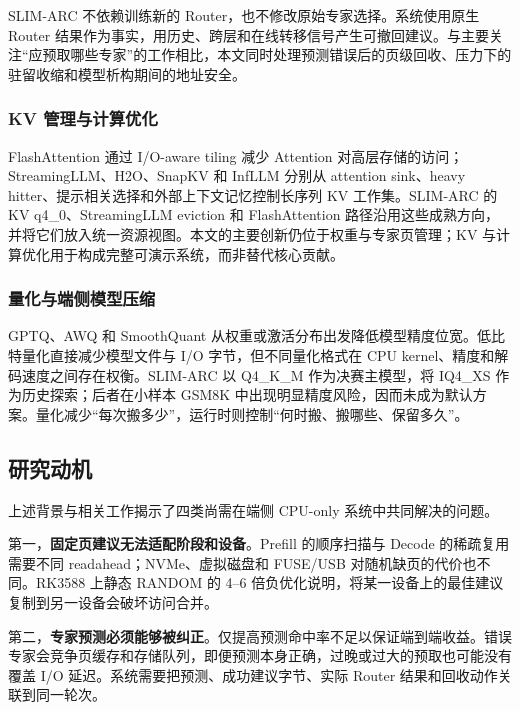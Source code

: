 SLIM-ARC 不依赖训练新的 Router，也不修改原始专家选择。系统使用原生 Router 结果作为事实，用历史、跨层和在线转移信号产生可撤回建议。与主要关注“应预取哪些专家”的工作相比，本文同时处理预测错误后的页级回收、压力下的驻留收缩和模型析构期间的地址安全。

\subsubsection{KV 管理与计算优化}

FlashAttention 通过 I/O-aware tiling 减少 Attention 对高层存储的访问\cite{flashattention2022}；StreamingLLM、H2O、SnapKV 和 InfLLM 分别从 attention sink、heavy hitter、提示相关选择和外部上下文记忆控制长序列 KV 工作集\cite{streamingllm2024,h2o2023,snapkv2024,infllm2024}。SLIM-ARC 的 KV q4\_0、StreamingLLM eviction 和 FlashAttention 路径沿用这些成熟方向，并将它们放入统一资源视图。本文的主要创新仍位于权重与专家页管理；KV 与计算优化用于构成完整可演示系统，而非替代核心贡献。

\subsubsection{量化与端侧模型压缩}

GPTQ、AWQ 和 SmoothQuant 从权重或激活分布出发降低模型精度位宽\cite{gptq2023,awq2024,smoothquant2023}。低比特量化直接减少模型文件与 I/O 字节，但不同量化格式在 CPU kernel、精度和解码速度之间存在权衡。SLIM-ARC 以 Q4\_K\_M 作为决赛主模型，将 IQ4\_XS 作为历史探索；后者在小样本 GSM8K 中出现明显精度风险，因而未成为默认方案。量化减少“每次搬多少”，运行时则控制“何时搬、搬哪些、保留多久”。

\subsection{研究动机}

上述背景与相关工作揭示了四类尚需在端侧 CPU-only 系统中共同解决的问题。

第一，\textbf{固定页建议无法适配阶段和设备}。Prefill 的顺序扫描与 Decode 的稀疏复用需要不同 readahead；NVMe、虚拟磁盘和 FUSE/USB 对随机缺页的代价也不同。RK3588 上静态 RANDOM 的 4--6 倍负优化说明，将某一设备上的最佳建议复制到另一设备会破坏访问合并。

第二，\textbf{专家预测必须能够被纠正}。仅提高预测命中率不足以保证端到端收益。错误专家会竞争页缓存和存储队列，即便预测本身正确，过晚或过大的预取也可能没有覆盖 I/O 延迟。系统需要把预测、成功建议字节、实际 Router 结果和回收动作关联到同一轮次。

